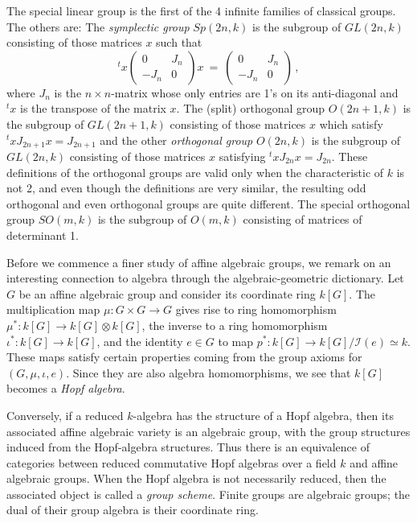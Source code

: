 \documentclass[12pt]{amsart}
\begin{document}
The special linear group is the first of the 4 infinite families of
classical groups.
The others are:
The {\sl symplectic group} $Sp(2n,k)$ is the subgroup of 
$GL(2n,k)$ consisting of those matrices $x$ such that 
$$
  ^tx\left(\begin{array}{cc}0&J_n\\-J_n&0\end{array}\right)x\ =\ 
  \left(\begin{array}{cc}0&J_n\\-J_n&0\end{array}\right)\,,
$$
where $J_n$ is the $n\times n$-matrix whose only entries are 1's on its
anti-diagonal and $^tx$ is the transpose of the matrix $x$.
The (split) orthogonal group $O(2n+1,k)$ is the subgroup of
$GL(2n+1,k)$ consisting of those matrices $x$ which satisfy 
$^txJ_{2n+1}x=J_{2n+1}$ and the other {\sl orthogonal group}
$O(2n,k)$ is the subgroup of $GL(2n,k)$ consisting of those matrices $x$
satisfying $^txJ_{2n}x=J_{2n}$.
These definitions of the orthogonal groups are valid only when the
characteristic of $k$ is not 2, and even though the definitions are very
similar, the resulting odd orthogonal and even orthogonal groups are quite
different. 
The special orthogonal group $SO(m,k)$ is the subgroup of $O(m,k)$
consisting of matrices of determinant 1.
\bigskip

Before we commence a finer study of affine algebraic groups, we remark on an 
interesting connection to algebra through the algebraic-geometric
dictionary.
Let $G$ be an affine algebraic group and consider its coordinate ring
$k[G]$.
The multiplication map $\mu:G\times G\to G$ gives rise to ring homomorphism
$\mu^*\colon k[G]\to k[G]\otimes k[G]$, the inverse to a ring homomorphism
$\iota^*\colon k[G]\to k[G]$, and the identity $e\in G$ to map 
$p^*\colon k[G]\to k[G]/{\mathcal I}(e)\simeq k$.
These maps satisfy certain properties coming from the group axioms for
$(G,\mu,\iota,e)$.
Since they are also algebra homomorphisms, we see that $k[G]$ becomes a 
{\sl Hopf algebra}.

Conversely, if a reduced $k$-algebra has the structure of a Hopf algebra,
then its associated affine algebraic variety is an algebraic group, with the  
group structures induced from the Hopf-algebra structures.
Thus there is an equivalence of categories between reduced commutative Hopf
algebras over a field $k$ and affine algebraic groups.
When the Hopf algebra is not necessarily reduced, then the associated object
is called a {\sl group scheme}.
Finite groups are algebraic groups; the dual of their group algebra is their
coordinate ring.
\end{document}
